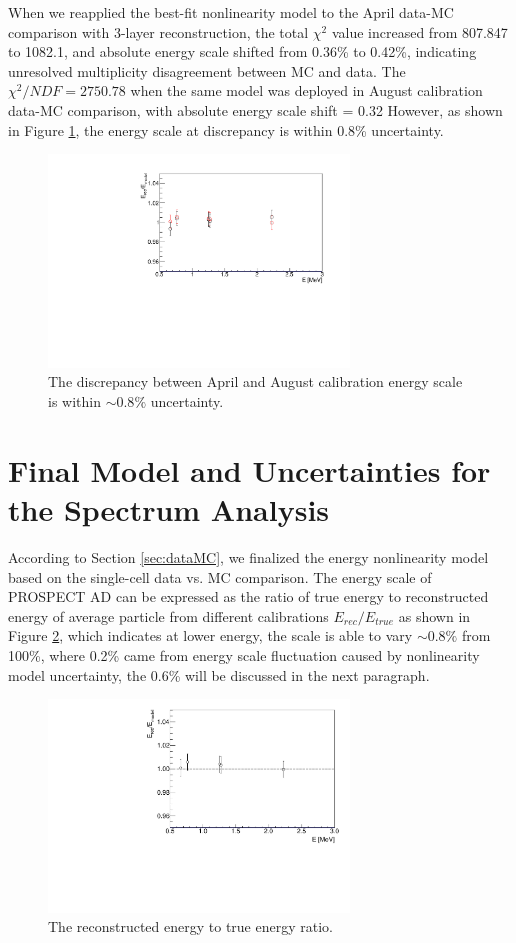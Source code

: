 When we reapplied the best-fit nonlinearity model to the April data-MC comparison with 3-layer reconstruction, the total $\chi^2$ value increased from 807.847 to 1082.1, and absolute energy scale shifted from 0.36\% to 0.42\%, indicating unresolved multiplicity disagreement between MC and data.
The $\chi^2/NDF = 2750.78$ when the same model was deployed in August calibration data-MC comparison, with absolute energy scale shift = 0.32
However, as shown in Figure \ref{fig:compare}, the energy scale at discrepancy is within 0.8\% uncertainty.

\begin{figure}[h!]
\centering
\includegraphics[width=80mm]{figures/EScaleCompare.pdf}
\caption{The discrepancy between April and August calibration energy scale is within $\sim0.8\%$ uncertainty.}
\label{fig:compare}
\end{figure}

\newpage

\section{Final Model and Uncertainties for the Spectrum Analysis}
According to Section \ref{sec:dataMC}, we finalized the energy nonlinearity model based on the single-cell data vs. MC comparison.
The energy scale of PROSPECT AD can be expressed as the ratio of true energy to reconstructed energy of average particle from different calibrations $E_{rec}/E_{true}$ as shown in Figure \ref{fig:escale}, which indicates at lower energy, the scale is able to vary $\sim0.8\%$ from 100\%, where 0.2\% came from energy scale fluctuation caused by nonlinearity model uncertainty, the 0.6\% will be discussed in the next paragraph.

\begin{figure}[h!]
\centering
\includegraphics[width=80mm]{figures/EScale.pdf}
\caption{The reconstructed energy to true energy ratio.}
\label{fig:escale}
\end{figure}

